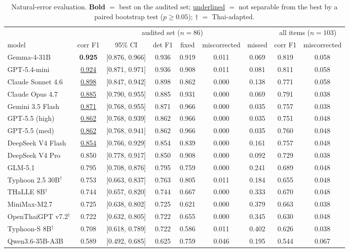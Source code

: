 \documentclass[11pt]{article}
\newcommand{\tie}[1]{\underline{#1}}
\begin{document}
\begin{table}[t]
\centering\small
\begin{tabular}{@{}lcccccccc@{}}
\toprule
 & \multicolumn{6}{c}{audited set ($n = 86$)} & \multicolumn{2}{c}{all items ($n = 103$)} \\
\cmidrule(lr){2-7}\cmidrule(l){8-9}
model & corr F1 & 95\% CI & det F1 & fixed & miscorrected & missed & corr F1 & miscorrected \\
\midrule
Gemma-4-31B                 & \textbf{0.925} & [0.876, 0.966] & 0.936 & 0.919 & 0.011 & 0.069 & 0.819 & 0.058 \\
GPT-5.4-mini                & \tie{0.924} & [0.871, 0.971] & 0.936 & 0.908 & 0.011 & 0.081 & 0.811 & 0.058 \\
Claude Sonnet 4.6           & \tie{0.898} & [0.847, 0.942] & 0.898 & 0.862 & 0.000 & 0.138 & 0.771 & 0.058 \\
Claude Opus 4.7             & \tie{0.885} & [0.790, 0.955] & 0.885 & 0.931 & 0.000 & 0.069 & 0.791 & 0.038 \\
Gemini 3.5 Flash            & \tie{0.871} & [0.768, 0.955] & 0.871 & 0.966 & 0.000 & 0.035 & 0.757 & 0.038 \\
GPT-5.5 (high)              & \tie{0.862} & [0.768, 0.939] & 0.862 & 0.966 & 0.000 & 0.035 & 0.751 & 0.048 \\
GPT-5.5 (med)               & \tie{0.862} & [0.768, 0.941] & 0.862 & 0.966 & 0.000 & 0.035 & 0.760 & 0.048 \\
DeepSeek V4 Flash           & \tie{0.854} & [0.766, 0.929] & 0.854 & 0.839 & 0.000 & 0.161 & 0.757 & 0.048 \\
DeepSeek V4 Pro             & 0.850 & [0.778, 0.917] & 0.850 & 0.908 & 0.000 & 0.092 & 0.729 & 0.038 \\
GLM-5.1                     & 0.795 & [0.708, 0.876] & 0.795 & 0.759 & 0.000 & 0.241 & 0.689 & 0.048 \\
Typhoon 2.5 30B$^\dagger$   & 0.753 & [0.663, 0.837] & 0.763 & 0.805 & 0.011 & 0.184 & 0.655 & 0.048 \\
THaLLE 8B$^\dagger$         & 0.744 & [0.657, 0.820] & 0.744 & 0.667 & 0.000 & 0.333 & 0.670 & 0.048 \\
MiniMax-M2.7                & 0.725 & [0.638, 0.802] & 0.725 & 0.621 & 0.000 & 0.379 & 0.663 & 0.038 \\
OpenThaiGPT v7.2$^\dagger$  & 0.722 & [0.632, 0.805] & 0.722 & 0.655 & 0.000 & 0.345 & 0.630 & 0.048 \\
Typhoon-S 8B$^\dagger$      & 0.708 & [0.618, 0.789] & 0.722 & 0.586 & 0.011 & 0.402 & 0.626 & 0.038 \\
Qwen3.6-35B-A3B             & 0.589 & [0.492, 0.685] & 0.625 & 0.759 & 0.046 & 0.195 & 0.544 & 0.067 \\
\bottomrule
\end{tabular}
\caption{Natural-error evaluation. \textbf{Bold} $=$ best on the audited set; \underline{underlined}
$=$ not separable from the best by a paired bootstrap test ($p \ge 0.05$); $\dagger$ $=$ Thai-adapted.}
\label{tab:natural}
\end{table}
\end{document}
